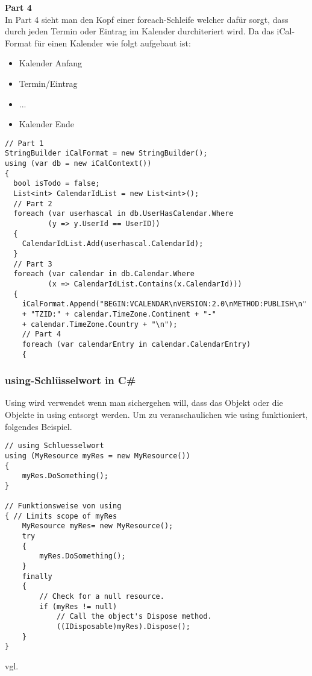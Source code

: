\textbf{Part 4} \\
In Part 4 sieht man den Kopf einer foreach-Schleife welcher dafür sorgt, dass durch jeden Termin oder Eintrag im Kalender durchiteriert wird. Da das iCal-Format für einen Kalender wie folgt aufgebaut ist: 
\begin{itemize}
\item Kalender Anfang
\item Termin/Eintrag
\item ...
\item Kalender Ende
\end{itemize}

\begin{lstlisting}[caption=Parser Verbindung zur DB mit dem Entity Framework, label=lst:test]
// Part 1
StringBuilder iCalFormat = new StringBuilder();
using (var db = new iCalContext())
{
  bool isTodo = false;
  List<int> CalendarIdList = new List<int>();
  // Part 2
  foreach (var userhascal in db.UserHasCalendar.Where
  		  (y => y.UserId == UserID))
  {
	CalendarIdList.Add(userhascal.CalendarId);
  }
  // Part 3
  foreach (var calendar in db.Calendar.Where
  		  (x => CalendarIdList.Contains(x.CalendarId)))
  {
    iCalFormat.Append("BEGIN:VCALENDAR\nVERSION:2.0\nMETHOD:PUBLISH\n"
	+ "TZID:" + calendar.TimeZone.Continent + "-" 
    + calendar.TimeZone.Country + "\n");
    // Part 4
    foreach (var calendarEntry in calendar.CalendarEntry)
    {
\end{lstlisting} 
\subsubsection{using-Schlüsselwort in C\#}
\label{usingkeyword}
Using wird verwendet wenn man sichergehen will, dass das Objekt oder die Objekte in using entsorgt werden. Um zu veranschaulichen wie using funktioniert, folgendes Beispiel.

\begin{lstlisting}[caption=Parser funktionsweise von using, label=lst:test]
// using Schluesselwort
using (MyResource myRes = new MyResource())
{
    myRes.DoSomething();
}
 
// Funktionsweise von using 
{ // Limits scope of myRes
    MyResource myRes= new MyResource();
    try
    {
        myRes.DoSomething();
    }
    finally
    {
        // Check for a null resource.
        if (myRes != null)
            // Call the object's Dispose method.
            ((IDisposable)myRes).Dispose();
    }
}
\end{lstlisting} \break vgl. \cite{ParserUsingKeyword}
